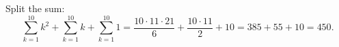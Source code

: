 Split the sum:
\[\sum_{k=1}^{10}k^2+\sum_{k=1}^{10}k+\sum_{k=1}^{10}1=\dfrac{10\cdot11\cdot21}{6}+\dfrac{10\cdot11}{2}+10=385+55+10=\boxed{450}.\]
